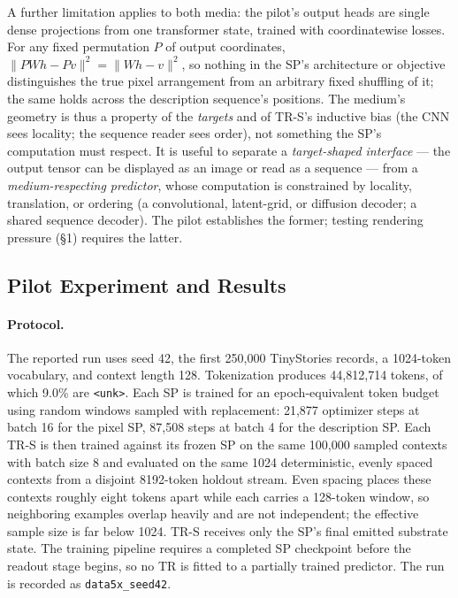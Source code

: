 \documentclass[11pt,a4paper]{article}
\begin{document}
A further limitation applies to both media: the pilot's output heads are single dense projections from one transformer state, trained with coordinatewise losses. For any fixed permutation $P$ of output coordinates, $\lVert PWh - Pv\rVert^2 = \lVert Wh - v\rVert^2$, so nothing in the SP's architecture or objective distinguishes the true pixel arrangement from an arbitrary fixed shuffling of it; the same holds across the description sequence's positions. The medium's geometry is thus a property of the \emph{targets} and of TR-S's inductive bias (the CNN sees locality; the sequence reader sees order), not something the SP's computation must respect. It is useful to separate a \emph{target-shaped interface} --- the output tensor can be displayed as an image or read as a sequence --- from a \emph{medium-respecting predictor}, whose computation is constrained by locality, translation, or ordering (a convolutional, latent-grid, or diffusion decoder; a shared sequence decoder). The pilot establishes the former; testing rendering pressure (§1) requires the latter.

\subsection{Pilot Experiment and Results}

\paragraph{Protocol.} The reported run uses seed 42, the first 250,000 TinyStories \cite{tinystories2023} records, a 1024-token vocabulary, and context length 128. Tokenization produces 44,812,714 tokens, of which 9.0\% are \texttt{<unk>}. Each SP is trained for an epoch-equivalent token budget using random windows sampled with replacement: 21,877 optimizer steps at batch 16 for the pixel SP, 87,508 steps at batch 4 for the description SP. Each TR-S is then trained against its frozen SP on the same 100,000 sampled contexts with batch size 8 and evaluated on the same 1024 deterministic, evenly spaced contexts from a disjoint 8192-token holdout stream. Even spacing places these contexts roughly eight tokens apart while each carries a 128-token window, so neighboring examples overlap heavily and are not independent; the effective sample size is far below 1024. TR-S receives only the SP's final emitted substrate state. The training pipeline requires a completed SP checkpoint before the readout stage begins, so no TR is fitted to a partially trained predictor. The run is recorded as \texttt{data5x\_seed42}.
\end{document}
